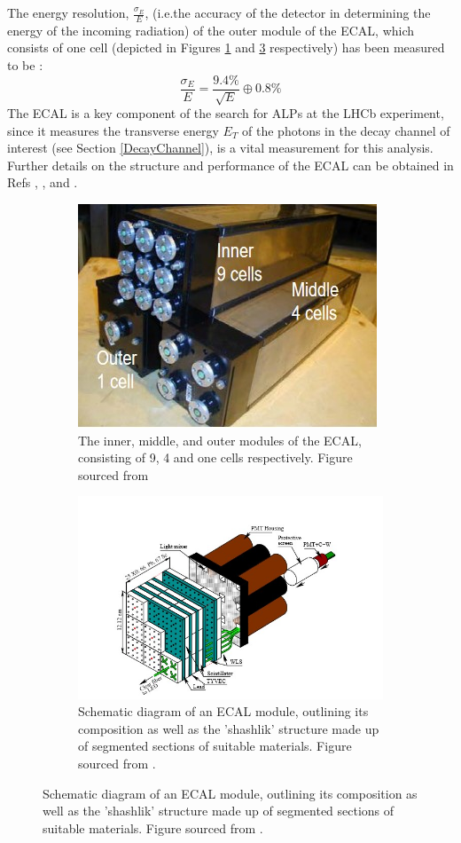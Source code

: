 The energy resolution, $\frac{\sigma_{E}}{E}$, (i.e.the accuracy of the detector in determining the energy of the incoming radiation) of the outer module of the ECAL, which consists of one cell (depicted in Figures \ref{ECALModule} and \ref{ECALStructure} respectively) has been measured to be \cite{GOLUTVIN2003258}:
\begin{equation}
    \frac{\sigma_{E}}{E} = \frac{9.4\%}{\sqrt{E}}\oplus 0.8\%
\end{equation}
The ECAL is a key component of the search for ALPs at the LHCb experiment, since it measures the transverse energy $E_{T}$ of the photons in the decay channel of interest (see Section \ref{DecayChannel}), is a vital measurement for this analysis. Further details on the structure and performance of the ECAL can be obtained in Refs \cite{AbellanBeteta:2020amj}, \cite{Amato:494264}, and \cite{GOLUTVIN2003258}.
\begin{figure}[H]
    \begin{subfigure}{0.4\textwidth}
    \includegraphics[scale = 0.8]{ECALModule.jpg}
    \caption{The inner, middle, and outer modules of the ECAL, consisting of 9, 4 and one cells respectively. Figure sourced from \cite{CERNLHCBECAL}}
    \label{ECALModule}
    \end{subfigure}
    \hfill
    \begin{subfigure}{0.5\textwidth}
        \includegraphics[scale = 0.7]{ECALStructure.jpg}
        \caption{Schematic diagram of an ECAL module, outlining its composition as well as the 'shashlik' structure made up of segmented sections of suitable materials. Figure sourced from \cite{AbellanBeteta:2020amj}.}
        \label{ECALStructure}
    \end{subfigure}
    \hfill
\end{figure}
